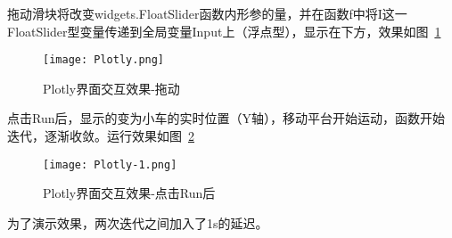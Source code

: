 拖动滑块将改变widgets.FloatSlider函数内形参的量，并在函数f中将I这一FloatSlider型变量传递到全局变量Input上（浮点型），显示在下方，效果如图~\ref{fig:Plotly}

\begin{figure}[htbp]
    \centering
    \texttt{[image: Plotly.png]}
    \caption{Plotly界面交互效果-拖动}
    \label{fig:Plotly}
\end{figure}

点击Run后，显示的变为小车的实时位置（Y轴），移动平台开始运动，函数开始迭代，逐渐收敛。运行效果如图~\ref{fig:Plotly-1}

\begin{figure}[htbp]
    \centering
    \texttt{[image: Plotly-1.png]}
    \caption{Plotly界面交互效果-点击Run后}
    \label{fig:Plotly-1}
\end{figure}

为了演示效果，两次迭代之间加入了1s的延迟。